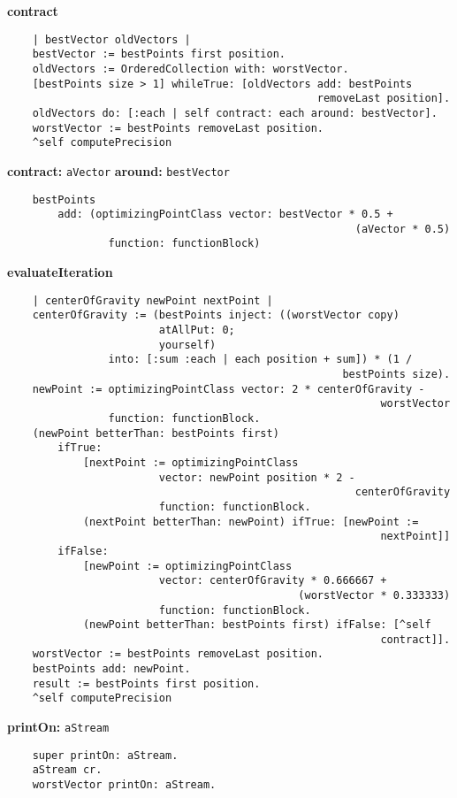 {\bf contract}
\begin{verbatim}
    | bestVector oldVectors |
    bestVector := bestPoints first position.
    oldVectors := OrderedCollection with: worstVector.
    [bestPoints size > 1] whileTrue: [oldVectors add: bestPoints 
                                                 removeLast position].
    oldVectors do: [:each | self contract: each around: bestVector].
    worstVector := bestPoints removeLast position.
    ^self computePrecision

\end{verbatim}
{\bf contract:} {\tt aVector} {\bf around:} {\tt bestVector}
\begin{verbatim}
    bestPoints 
        add: (optimizingPointClass vector: bestVector * 0.5 + 
                                                       (aVector * 0.5)
                function: functionBlock)

\end{verbatim}
{\bf evaluateIteration}
\begin{verbatim}
    | centerOfGravity newPoint nextPoint |
    centerOfGravity := (bestPoints inject: ((worstVector copy)
                        atAllPut: 0;
                        yourself)
                into: [:sum :each | each position + sum]) * (1 / 
                                                     bestPoints size).
    newPoint := optimizingPointClass vector: 2 * centerOfGravity - 
                                                           worstVector
                function: functionBlock.
    (newPoint betterThan: bestPoints first) 
        ifTrue: 
            [nextPoint := optimizingPointClass 
                        vector: newPoint position * 2 - 
                                                       centerOfGravity
                        function: functionBlock.
            (nextPoint betterThan: newPoint) ifTrue: [newPoint := 
                                                           nextPoint]]
        ifFalse: 
            [newPoint := optimizingPointClass 
                        vector: centerOfGravity * 0.666667 + 
                                              (worstVector * 0.333333)
                        function: functionBlock.
            (newPoint betterThan: bestPoints first) ifFalse: [^self 
                                                           contract]].
    worstVector := bestPoints removeLast position.
    bestPoints add: newPoint.
    result := bestPoints first position.
    ^self computePrecision

\end{verbatim}
{\bf printOn:} {\tt aStream}
\begin{verbatim}
    super printOn: aStream.
    aStream cr. 
    worstVector printOn: aStream.

\end{verbatim}

